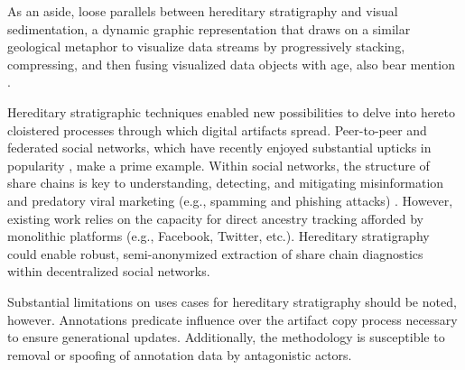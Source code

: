 As an aside, loose parallels between hereditary stratigraphy and visual sedimentation, a dynamic graphic representation that draws on a similar geological metaphor to visualize data streams by progressively stacking, compressing, and then fusing visualized data objects with age, also bear mention \citep{huron2013visual}.

Hereditary stratigraphic techniques enabled new possibilities to delve into hereto cloistered processes through which digital artifacts spread.
Peer-to-peer and federated social networks, which have recently enjoyed substantial upticks in popularity \citep{la2021understanding}, make a prime example.
Within social networks, the structure of share chains is key to understanding, detecting, and mitigating misinformation \citep{kucharski2016study,raponi2022fake} and predatory viral marketing (e.g., spamming and phishing attacks) \citep{guidi2018managing}.
However, existing work relies on the capacity for direct ancestry tracking afforded by monolithic platforms (e.g., Facebook, Twitter, etc.).
Hereditary stratigraphy could enable robust, semi-anonymized extraction of share chain diagnostics within decentralized social networks.

Substantial limitations on uses cases for hereditary stratigraphy should be noted, however.
Annotations predicate influence over the artifact copy process necessary to ensure generational updates.
Additionally, the methodology is susceptible to removal or spoofing of annotation data by antagonistic actors.
